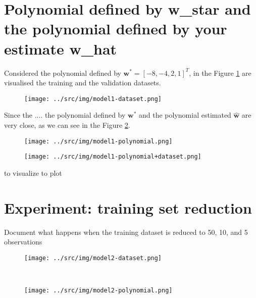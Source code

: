 \documentclass[a4paper,12pt]{article} %
\begin{document}
	\section{Polynomial defined by w\_star and the polynomial defined by your estimate w\_hat} 
	Considered the polynomial defined by $\textbf{w}^*=[-8,-4,2,1]^T$, in the Figure \ref{fig:model1-dataset} are visualised the training and the validation datasets. 
	
	\begin{figure}[H]
		\centering
		\texttt{[image: ../src/img/model1-dataset.png]}
		\label{fig:model1-dataset}
	\end{figure}
	
	Since the .... the polynomial defined by $\textbf{w}^*$ and the polynomial estimated $\hat{\textbf{w}}$ are very close, as we can see in the Figure \ref{fig:model1-polynomial}.
	
	\begin{figure}[H]
		\centering
		\texttt{[image: ../src/img/model1-polynomial.png]}
		\label{fig:model1-polynomial}
	\end{figure}
	
	\begin{figure}[H]
		\centering
		\texttt{[image: ../src/img/model1-polynomial+dataset.png]}
		\label{fig:model1-polynomial+dataset}
	\end{figure}
	
	to visualize 
	to plot
	
	\section{Experiment: training set reduction}
	
	Document what happens when the training dataset is reduced to 50, 10, and 5 observations
	
	\begin{figure}[H]
		\begin{minipage}[c]{.5\textwidth}
			\centering
			\texttt{[image: ../src/img/model2-dataset.png]}
			\label{fig:model2-dataset}
		\end{minipage}
		~
		\begin{minipage}[c]{.5\textwidth}
			\centering
			\texttt{[image: ../src/img/model2-polynomial.png]}
			\label{fig:model2-polynomial}
		\end{minipage}
	\end{figure}
	
\end{document}
